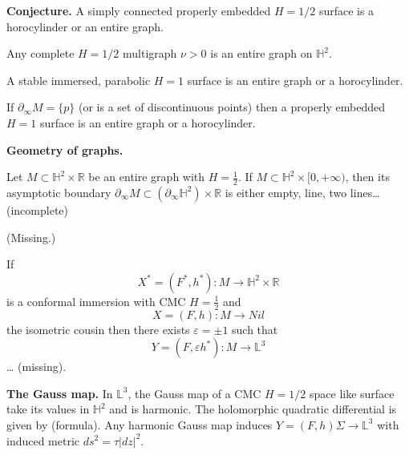 \medskip\noindent
{\bf Conjecture.}
A simply connected properly embedded
$H=1/2$ surface is a horocylinder or an
entire graph.

\begin{theorem}
\label{theorem-duplicate-2}
Any complete $H=1/2$ multigraph
$\nu>0$ is an entire graph on $\mathbb{H}^2$.
\end{theorem}

\begin{theorem}
\label{theorem-mpr}
A stable immersed, parabolic $H=1$ surface
is an entire graph or a horocylinder.
\end{theorem}

\begin{theorem}
\label{theorem-ar}
If $\partial_\infty M = \{p\}$ (or is a set
of discontinuous points) then a properly
embedded $H=1$ surface is an entire graph or
a horocylinder.
\end{theorem}

\medskip\noindent
{\bf Geometry of graphs.}

\begin{theorem}
\label{theorem-mr}
Let $M \subset \mathbb{H}^2 \times
\mathbb{R}$ be an entire graph with $H=
\frac{1}{2}$. If $M \subset \mathbb{H}^2
\times[0,+\infty)$, then its asymptotic
boundary $\partial_\infty M \subset
(\partial_{\infty} \mathbb{H}^2 )\times \mathbb{R}$
is either empty, line, two lines… (incomplete)
\end{theorem}

\begin{theorem}
\label{theorem-mr2}
(Missing.)
\end{theorem}

\begin{proposition}
\label{proposition-fm}
If
$$
X^* =(F^* ,h^* ):M \to \mathbb{H}^2 \times
\mathbb{R}
$$
is a conformal immersion with CMC
$H=\frac{1}{2}$ and 
$$
X = (F,h):M \to Nil
$$
the isometric cousin then there exists
$\varepsilon  = \pm 1$ such that
$$
Y = (F,\varepsilon h ^* ):M \to \mathbb{L}^3
$$
… (missing).
\end{proposition}

\medskip\noindent
{\bf The Gauss map.}
In $\mathbb{L}^3$, the Gauss map of a CMC
$H=1/2$ space like surface take its values
in $\mathbb{H}^2$ and is harmonic.
The holomorphic quadratic differential is
given by (formula). Any harmonic Gauss map
induces $Y=(F,h) \Sigma \to \mathbb{L}^3$
with induced metric $ds^2= \tau |dz|^2$.

